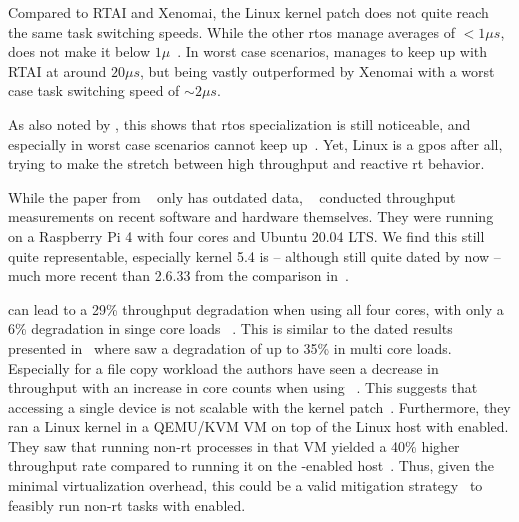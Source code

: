 \documentclass[10pt,twocolumn,a4paper]{article}
\begin{document}
Compared to RTAI and Xenomai, the Linux kernel patch does not quite reach the same task switching speeds.
While the other \acrshort{rtos} manage averages of $<1\mu s$,  does not make it below $1 \mu$~\cite{reghenzani_realtime_2019}.
In worst case scenarios,  manages to keep up with RTAI at around $20\mu s$, but being vastly outperformed by Xenomai with a worst case task switching speed of $\sim 2\mu s$.

As also noted by \citeauthor{reghenzani_realtime_2019}, this shows that \acrshort{rtos} specialization is still noticeable, and especially in worst case scenarios  cannot keep up~\cite{reghenzani_realtime_2019}.
Yet, Linux is a \acrfull{gpos} after all, trying to make the stretch between high throughput and reactive \acrshort{rt} behavior.

While the paper from \citeauthor{reghenzani_realtime_2019}~\cite{reghenzani_realtime_2019} only has outdated data, \citeauthor{li_performance_2023}~\cite{li_performance_2023} conducted throughput measurements on recent software and hardware themselves.
They were running on a Raspberry Pi 4 with four cores and Ubuntu 20.04 LTS.
We find this still quite representable, especially kernel 5.4 is -- although still quite dated by now -- much more recent than 2.6.33 from the comparison in~\cite{reghenzani_realtime_2019}.

 can lead to a 29\% throughput degradation when using all four cores, with only a 6\% degradation in singe core loads ~\cite{li_performance_2023}.
This is similar to the dated results presented in~\cite{reghenzani_realtime_2019} where \citeauthor{reghenzani_realtime_2019} saw a degradation of up to 35\% in multi core loads.
Especially for a file copy workload the authors have seen a decrease in throughput with an increase in core counts when using ~\cite{li_performance_2023}.
This suggests that accessing a single device is not scalable with the kernel patch~\cite{li_performance_2023}.
Furthermore, they ran a Linux kernel in a QEMU/KVM VM on top of the Linux host with  enabled.
They saw that running non-\acrshort{rt} processes in that VM yielded a 40\% higher throughput rate compared to running it on the -enabled host~\cite{li_performance_2023}.
Thus, given the minimal virtualization overhead, this could be a valid mitigation strategy~\cite{li_performance_2023} to feasibly run non-\acrshort{rt} tasks with  enabled.
\end{document}
